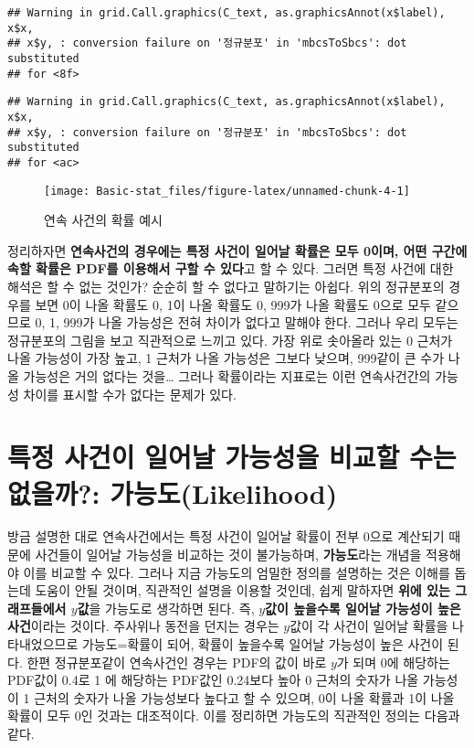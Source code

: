 \documentclass[]{book}
\begin{document}
\begin{verbatim}
## Warning in grid.Call.graphics(C_text, as.graphicsAnnot(x$label), x$x,
## x$y, : conversion failure on '정규분포' in 'mbcsToSbcs': dot substituted
## for <8f>
\end{verbatim}

\begin{verbatim}
## Warning in grid.Call.graphics(C_text, as.graphicsAnnot(x$label), x$x,
## x$y, : conversion failure on '정규분포' in 'mbcsToSbcs': dot substituted
## for <ac>
\end{verbatim}

\begin{figure}

{\centering \texttt{[image: Basic-stat\_files/figure-latex/unnamed-chunk-4-1]} 

}

\caption{연속 사건의 확률 예시}\label{fig:unnamed-chunk-4}
\end{figure}

정리하자면 \textbf{연속사건의 경우에는 특정 사건이 일어날 확률은 모두 0이며, 어떤 구간에 속할 확률은 PDF를 이용해서 구할 수 있다}고 할 수 있다. 그러면 특정 사건에 대한 해석은 할 수 없는 것인가? 순순히 할 수 없다고 말하기는 아쉽다. 위의 정규분포의 경우를 보면 0이 나올 확률도 0, 1이 나올 확률도 0, 999가 나올 확률도 0으로 모두 같으므로 0, 1, 999가 나올 가능성은 전혀 차이가 없다고 말해야 한다. 그러나 우리 모두는 정규분포의 그림을 보고 직관적으로 느끼고 있다. 가장 위로 솟아올라 있는 0 근처가 나올 가능성이 가장 높고, 1 근처가 나올 가능성은 그보다 낮으며, 999같이 큰 수가 나올 가능성은 거의 없다는 것을\ldots{} 그러나 확률이라는 지표로는 이런 연속사건간의 가능성 차이를 표시할 수가 없다는 문제가 있다.

\hypertarget{uxd2b9uxc815-uxc0acuxac74uxc774-uxc77cuxc5b4uxb0a0-uxac00uxb2a5uxc131uxc744-uxbe44uxad50uxd560-uxc218uxb294-uxc5c6uxc744uxae4c-uxac00uxb2a5uxb3c4likelihood}{%
\section{특정 사건이 일어날 가능성을 비교할 수는 없을까?: 가능도(Likelihood)}\label{uxd2b9uxc815-uxc0acuxac74uxc774-uxc77cuxc5b4uxb0a0-uxac00uxb2a5uxc131uxc744-uxbe44uxad50uxd560-uxc218uxb294-uxc5c6uxc744uxae4c-uxac00uxb2a5uxb3c4likelihood}}

방금 설명한 대로 연속사건에서는 특정 사건이 일어날 확률이 전부 0으로 계산되기 때문에 사건들이 일어날 가능성을 비교하는 것이 불가능하며, \textbf{가능도}라는 개념을 적용해야 이를 비교할 수 있다. 그러나 지금 가능도의 엄밀한 정의를 설명하는 것은 이해를 돕는데 도움이 안될 것이며, 직관적인 설명을 이용할 것인데, 쉽게 말하자면 \textbf{위에 있는 그래프들에서 \(y\)값}을 가능도로 생각하면 된다. 즉, \textbf{\(y\)값이 높을수록 일어날 가능성이 높은 사건}이라는 것이다. 주사위나 동전을 던지는 경우는 \(y\)값이 각 사건이 일어날 확률을 나타내었으므로 가능도=확률이 되어, 확률이 높을수록 일어날 가능성이 높은 사건이 된다. 한편 정규분포같이 연속사건인 경우는 PDF의 값이 바로 \(y\)가 되며 0에 해당하는 PDF값이 0.4로 1 에 해당하는 PDF값인 0.24보다 높아 0 근처의 숫자가 나올 가능성이 1 근처의 숫자가 나올 가능성보다 높다고 할 수 있으며, 0이 나올 확률과 1이 나올 확률이 모두 0인 것과는 대조적이다. 이를 정리하면 가능도의 직관적인 정의는 다음과 같다.
\end{document}
